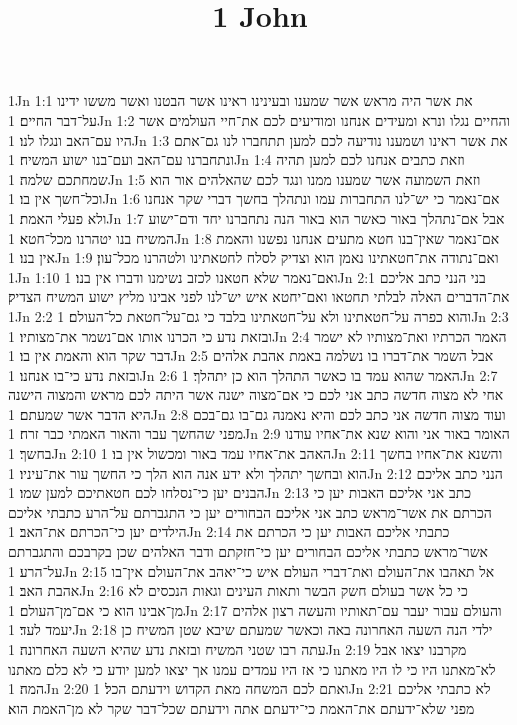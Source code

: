 

\title{1 John}

1Jn 1:1  את אשר היה מראש אשר שמענו ובעינינו ראינו אשר הבטנו ואשר מששו ידינו על־דבר החיים׃
1Jn 1:2  והחיים נגלו ונרא ומעידים אנחנו ומודיעים לכם את־חיי העולמים אשר היו עם־האב ונגלו לנו׃
1Jn 1:3  את אשר ראינו ושמענו נודיעה לכם למען תתחברו לנו גם־אתם ונתחברנו עם־האב ועם־בנו ישוע המשיח׃
1Jn 1:4  וזאת כתבים אנחנו לכם למען תהיה שמחתכם שלמה׃
1Jn 1:5  וזאת השמועה אשר שמענו ממנו ונגד לכם שהאלהים אור הוא וכל־חשך אין בו׃
1Jn 1:6  אם־נאמר כי יש־לנו התחברות עמו ונתהלך בחשך דברי שקר אנחנו ולא פעלי האמת׃
1Jn 1:7  אבל אם־נתהלך באור כאשר הוא באור הנה נתחברנו יחד ודם־ישוע המשיח בנו יטהרנו מכל־חטא׃
1Jn 1:8  אם־נאמר שאין־בנו חטא מתעים אנחנו נפשנו והאמת אין בנו׃
1Jn 1:9  ואם־נתודה את־חטאתינו נאמן הוא וצדיק לסלח לחטאתינו ולטהרנו מכל־עון׃
1Jn 1:10  ואם־נאמר שלא חטאנו לכזב נשימנו ודברו אין בנו׃
1Jn 2:1  בני הנני כתב אליכם את־הדברים האלה לבלתי תחטאו ואם־יחטא איש יש־לנו לפני אבינו מליץ ישוע המשיח הצדיק׃
1Jn 2:2  והוא כפרה על־חטאתינו ולא על־חטאתינו בלבד כי גם־על־חטאת כל־העולם׃
1Jn 2:3  ובזאת נדע כי הכרנו אותו אם־נשמר את־מצותיו׃
1Jn 2:4  האמר הכרתיו ואת־מצותיו לא ישמר דבר שקר הוא והאמת אין בו׃
1Jn 2:5  אבל השמר את־דברו בו נשלמה באמת אהבת אלהים ובזאת נדע כי־בו אנחנו׃
1Jn 2:6  האמר שהוא עמד בו כאשר התהלך הוא כן יתהלך׃
1Jn 2:7  אחי לא מצוה חדשה כתב אני לכם כי אם־מצוה ישנה אשר היתה לכם מראש והמצוה הישנה היא הדבר אשר שמעתם׃
1Jn 2:8  ועוד מצוה חדשה אני כתב לכם והיא נאמנה גם־בו גם־בכם מפני שהחשך עבר והאור האמתי כבר זרח׃
1Jn 2:9  האומר באור אני והוא שנא את־אחיו עודנו בחשך׃
1Jn 2:10  האהב את־אחיו עמד באור ומכשול אין בו׃
1Jn 2:11  והשנא את־אחיו בחשך הוא ובחשך יתהלך ולא ידע אנה הוא הלך כי החשך עור את־עיניו׃
1Jn 2:12  הנני כתב אליכם הבנים יען כי־נסלחו לכם חטאתיכם למען שמו׃
1Jn 2:13  כתב אני אליכם האבות יען כי הכרתם את אשר־מראש כתב אני אליכם הבחורים יען כי התגברתם על־הרע כתבתי אליכם הילדים יען כי־הכרתם את־האב׃
1Jn 2:14  כתבתי אליכם האבות יען כי הכרתם את אשר־מראש כתבתי אליכם הבחורים יען כי־חזקתם ודבר האלהים שכן בקרבכם והתגברתם על־הרע׃
1Jn 2:15  אל תאהבו את־העולם ואת־דברי העולם איש כי־יאהב את־העולם אין־בו אהבת האב׃
1Jn 2:16  כי כל אשר בעולם חשק הבשר ותאות העינים וגאות הנכסים לא מן־אבינו הוא כי אם־מן־העולם׃
1Jn 2:17  והעולם עבור יעבר עם־תאותיו והעשה רצון אלהים יעמד לעד׃
1Jn 2:18  ילדי הנה השעה האחרונה באה וכאשר שמעתם שיבא שטן המשיח כן עתה רבו שטני המשיח ובזאת נדע שהיא השעה האחרונה׃
1Jn 2:19  מקרבנו יצאו אבל לא־מאתנו היו כי לו היו מאתנו כי אז היו עמדים עמנו אך יצאו למען יודע כי לא כלם מאתנו המה׃
1Jn 2:20  ואתם לכם המשחה מאת הקדוש וידעתם הכל׃
1Jn 2:21  לא כתבתי אליכם מפני שלא־ידעתם את־האמת כי־ידעתם אתה וידעתם שכל־דבר שקר לא מן־האמת הוא׃
